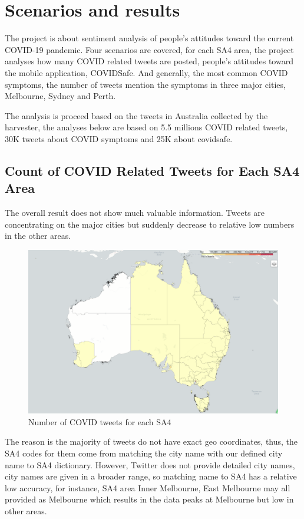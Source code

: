     \section{Scenarios and results}
    The project is about sentiment analysis of people's attitudes toward the current COVID-19 pandemic. Four scenarios are covered, for each SA4 area, the project analyses how many COVID related tweets are posted, people's attitudes toward the mobile application, COVIDSafe. And generally, the most common COVID symptoms, the number of tweets mention the symptoms in three major cities, Melbourne, Sydney and Perth.
    
    The analysis is proceed based on the tweets in Australia collected by the harvester, the analyses below are based on 5.5 millions COVID related tweets, 30K tweets about COVID symptoms and 25K about covidsafe.
    
    \subsection{Count of COVID Related Tweets for Each SA4 Area}
    
    The overall result does not show much valuable information. Tweets are concentrating on the major cities but suddenly decrease to relative low numbers in the other areas. 
    
    \begin{figure}[H]
    \centering
    \includegraphics[scale=0.35]{city_analytics/report/images/covidtweet.png}
    \caption{Number of COVID tweets for each SA4}
    \label{fig:Number of COVID tweets for each SA4}
    \end{figure}
    
    The reason is the majority of tweets do not have exact geo coordinates, thus, the SA4 codes for them come from matching the city name with our defined city name to SA4 dictionary. However, Twitter does not provide detailed city names, city names are given in a broader range, so matching name to SA4 has a relative low accuracy, for instance, SA4 area Inner Melbourne, East Melbourne may all provided as Melbourne which results in the data peaks at Melbourne but low in other areas.
    
